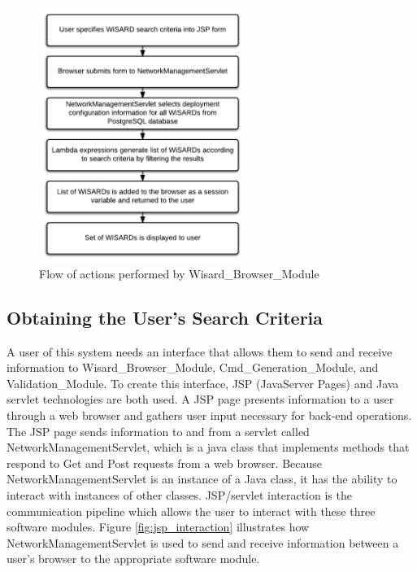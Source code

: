 \begin{figure}[H]
	\centering
	\includegraphics[width=0.6\textwidth]{figures/flow_diagram_wisard_browser.png}
	\caption{Flow of actions performed by Wisard\_Browser\_Module}
	\label{fig:wisard_browser_flow}
\end{figure}

\subsection{Obtaining the User's Search Criteria}
A user of this system needs an interface that allows them to send and receive information to Wisard\_Browser\_Module, Cmd\_Generation\_Module, and Validation\_Module. To create this interface, JSP (JavaServer Pages) and Java servlet technologies are both used. A JSP page presents information to a user through a web browser and gathers user input necessary for back-end operations. The JSP page sends information to and from a servlet called NetworkManagementServlet, which is a java class that implements methods that respond to Get and Post requests from a web browser. Because NetworkManagementServlet is an instance of a Java class, it has the ability to interact with instances of other classes. JSP/servlet interaction is the communication pipeline which allows the user to interact with these three software modules. Figure \ref{fig:jsp_interaction} illustrates how NetworkManagementServlet is used to send and receive information between a user's browser to the appropriate software module. 

